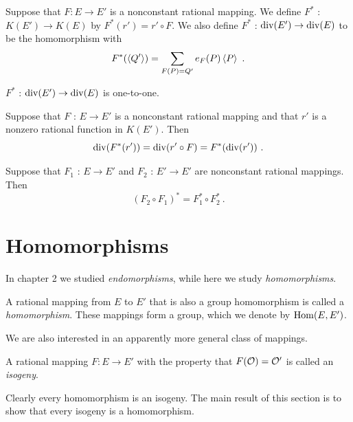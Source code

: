 \begin{defi}
\label{d2.1.3}
Suppose that $F:E\rightarrow E'$ is a nonconstant rational mapping. We define $F^{*}$ : $K(E')\rightarrow K(E)$ by $F^{*}(r')=r'\circ F$. We also define $F^{*}$ : $\operatorname{div}(E')\rightarrow \operatorname{div}(E)$ to be the homomorphism with
$$
F^{*}(\divisor{Q'})=\sum_{F(P)=Q'}e_{F}(P)\divisor{P}\ .
$$
\end{defi}

\begin{prop}
\label{p2.1.3}
$F^{*}$ : $\operatorname{div}(E')\rightarrow \operatorname{div}(E)$ is one-to-one.
\end{prop}

\begin{prop}
\label{p2.1.4}
Suppose that $F$ : $E\rightarrow E'$ is a nonconstant rational mapping and that $r'$ is a nonzero rational function in $K(E')$. Then
$$
\operatorname{div}(F^{*}(r'))=\operatorname{div}(r'\circ F)=F^{*}(\operatorname{div}(r'))\ .
$$
\end{prop}

\begin{prop}
\label{p2.1.5}
Suppose that $F_{1}$ : $E\rightarrow E'$ and $F_{2}$ : $E'\rightarrow E'$ are nonconstant rational mappings. Then
$$
(F_{2}\circ F_{1})^{*}=F_{1}^{*}\circ F_{2}^{*}\ .
$$
\end{prop}

\section{Homomorphisms}
\label{sec2.2}

In chapter 2 we studied {\it endomorphisms}, while here we study {\it homomorphisms}.

\begin{defi}
\label{d2.2.4}
A rational mapping from $E$ to $E'$ that is also a group homomorphism is called a {\it homomorphism}. These mappings form a group, which we denote by $\operatorname{Hom}(E,E')$.
\end{defi}

We are also interested in an apparently more general class of mappings.

\begin{defi}
\label{d2.2.5}
A rational mapping $F:E\rightarrow E'$ with the property that $F(\mathcal{O})=\mathcal{O}'$ is called an {\it isogeny}.
\end{defi}

Clearly every homomorphism is an isogeny. The main result of this section is to show that every isogeny is a homomorphism.

